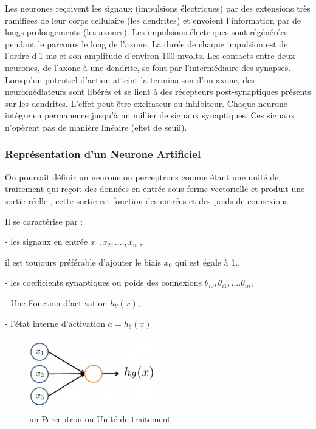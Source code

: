 Les neurones reçoivent les signaux (impulsions électriques) par des extensions très ramifiées de leur corps cellulaire (les dendrites) et envoient l'information par de longs prolongements (les axones). Les impulsions électriques sont régénérées pendant le parcours le long de l'axone. La durée de chaque impulsion est de l'ordre d'1 ms et son amplitude d'environ 100 mvolts.
Les contacts entre deux neurones, de l'axone à une dendrite, se font par l'intermédiaire des synapses. Lorsqu'un potentiel d'action atteint la terminaison d'un axone, des neuromédiateurs sont libérés et se lient à des récepteurs post-synaptiques présents sur les dendrites. L'effet peut être excitateur ou inhibiteur.
Chaque neurone intègre en permanence jusqu'à un millier de signaux synaptiques. Ces signaux n'opèrent pas de manière linéaire (effet de seuil).

\subsubsection{Représentation d'un Neurone Artificiel }
On pourrait définir un neurone  ou perceptrons comme étant une unité de traitement qui reçoit des données en entrée sous forme vectorielle et produit une sortie réelle , cette sortie est fonction des entrées et des poids de connexions.

Il se caractérise par :

- les signaux en entrée  ${x}_{1},{x}_{2},....,{x}_{n}$ ,

 il est toujours préférable d'ajouter le biais ${x}_{0}$ qui est égale à 1.,

- les coefficients synaptiques ou poids des connexions ${\theta}_{i0},{\theta}_{i1},....{\theta}_{in}$,

- Une Fonction d'activation ${h}_{\theta}(x)$,

- l'état interne d'activation $a={h}_{\theta}(x)$

\begin{figure}[ht]
	\centering
	\includegraphics[width=0.5\textwidth]{fig/SimpleANN.png}
	\caption[Short caption]{un Perceptron  ou Unité de traitement}
	\label{fig:image10}
\end{figure}

